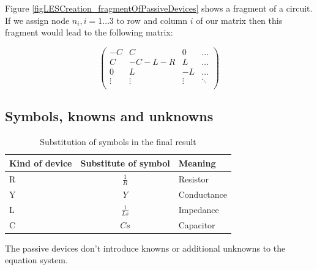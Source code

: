 Figure \ref{figLESCreation_fragmentOfPassiveDevices} shows a fragment of
a circuit. If we assign node $n_i, i=1 \ldots 3$ to row and column $i$ of
our matrix then this fragment would lead to the following matrix:

\begin{displaymath}
\label{eqLESCreation_fragmentOfPassiveDevices}
\left(
\begin{array}{cccc}
-C      & C      &  0     & \ldots \\
 C      & -C-L-R &  L     & \ldots \\
 0      &    L   & -L     & \ldots \\
 \vdots & \vdots & \vdots & \ddots \\
\end{array}
\right)
\end{displaymath}


\subsection{Symbols, knowns and unknowns}

\begin{table}[bt]
\begin{center}
{
\setlength{\extrarowheight}{2pt} %
\begin{tabular}{|l|c|p{2cm}|}

\hline

Kind of device & Substitute of symbol & Meaning \\
\hline

R & $\frac{1}{R}$  & Resistor    \\
Y & $Y$            & Conductance \\
L & $\frac{1}{Ls}$ & Impedance   \\
C & $Cs$           & Capacitor   \\

 \hline
\end{tabular}
\caption{Substitution of symbols in the final result}
\label{tabSubstOfSymbols}
} %
\end{center}
\end{table}

The passive devices don't introduce knowns or additional unknowns to the
equation system.

